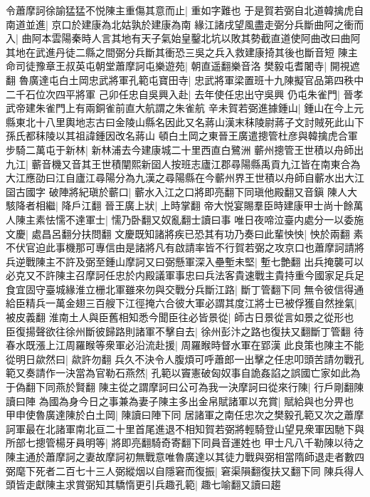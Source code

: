 令蕭摩訶徐諭猛猛不悦陳主重傷其意而止|{
	重如字難也}
于是賀若弼自北道韓擒虎自南道並進|{
	京口於建康為北姑孰於建康為南}
緣江諸戌望風盡走弼分兵斷曲阿之衝而入|{
	曲阿本雲陽秦時人言其地有天子氣始皇鑿北坑以敗其勢截直道使阿曲改曰曲阿其地在武進丹徒二縣之間弼分兵斷其衝恐三吳之兵入救建康掎其後也斷音短}
陳主命司徒豫章王叔英屯朝堂蕭摩訶屯樂遊苑|{
	朝直遥翻樂音洛}
樊毅屯耆闍寺|{
	開視遮翻}
魯廣達屯白土岡忠武將軍孔範屯寶田寺|{
	忠武將軍梁置班十九陳擬官品第四秩中二千石位次四平將軍}
己卯任忠自吳興入赴|{
	去年使任忠出守吳興}
仍屯朱雀門|{
	晉孝武帝建朱雀門上有兩銅雀前直大航謂之朱雀航}
辛未賀若弼進據鍾山|{
	鍾山在今上元縣東北十八里輿地志古曰金陵山縣名因此又名蔣山漢末秣陵尉蔣子文討賊死此山下孫氏都秣陵以其祖諱鍾因改名蔣山}
頓白土岡之東晉王廣遣摠管杜彦與韓擒虎合軍步騎二萬屯于新林|{
	新林浦去今建康城二十里西直白鷺洲}
蘄州摠管王世積以舟師出九江|{
	蘄音機又音其王世積闡熙新囶人按班志廬江郡尋陽縣禹貢九江皆在南東合為大江應劭曰江自廬江尋陽分為九漢之尋陽縣在今蘄州界王世積以舟師自蘄水出大江囶古國字}
破陣將紀瑱於蘄口|{
	蘄水入江之口將即亮翻下同瑱他殿翻又音鎭}
陳人大駭降者相繼|{
	降戶江翻}
晉王廣上狀|{
	上時掌翻}
帝大悦宴賜羣臣時建康甲士尚十餘萬人陳主素怯懦不達軍士|{
	懦乃卧翻又奴亂翻士讀曰事}
唯日夜啼泣臺内處分一以委施文慶|{
	處昌呂翻分扶問翻}
文慶既知諸將疾已恐其有功乃奏曰此輩怏怏|{
	怏於兩翻}
素不伏官迫此事機那可專信由是諸將凡有啟請率皆不行賀若弼之攻京口也蕭摩訶請將兵逆戰陳主不許及弼至鍾山摩訶又曰弼懸軍深入壘塹未堅|{
	塹七艶翻}
出兵掩襲可以必克又不許陳主召摩訶任忠於内殿議軍事忠曰兵法客貴速戰主貴持重今國家足兵足食宜固守臺城緣淮立栅北軍雖來勿與交戰分兵斷江路|{
	斷丁管翻下同}
無令彼信得通給臣精兵一萬金翅三百艘下江徑掩六合彼大軍必謂其度江將士已被俘獲自然挫氣|{
	被皮義翻}
淮南土人與臣舊相知悉今聞臣往必皆景從|{
	師古日景從言如景之從形也}
臣復揚聲欲往徐州斷彼歸路則諸軍不擊自去|{
	徐州彭汴之路也復扶又翻斷丁管翻}
待春水既漲上江周羅睺等衆軍必沿流赴援|{
	周羅睺時督水軍在郢漢}
此良策也陳主不能從明日歘然曰|{
	歘許勿翻}
兵久不決令人腹煩可呼蕭郎一出擊之任忠叩頭苦請勿戰孔範又奏請作一決當為官勒石燕然|{
	孔範以竇憲破匈奴事自詭姦諂之誤國亡家如此為于偽翻下同燕於賢翻}
陳主從之謂摩訶曰公可為我一決摩訶曰從來行陳|{
	行戶剛翻陳讀曰陣}
為國為身今日之事兼為妻子陳主多出金帛賦諸軍以充賞|{
	賦給與也分畀也}
甲申使魯廣達陳於白土岡|{
	陳讀曰陣下同}
居諸軍之南任忠次之樊毅孔範又次之蕭摩訶軍最在北諸軍南北亘二十里首尾進退不相知賀若弼將輕騎登山望見衆軍因馳下與所部七摠管楊牙員明等|{
	將即亮翻騎奇寄翻下同員音運姓也}
甲士凡八千勒陳以待之陳主通於蕭摩訶之妻故摩訶初無戰意唯魯廣達以其徒力戰與弼相當隋師退走者數四弼麾下死者二百七十三人弼縱烟以自隱窘而復振|{
	窘渠隕翻復扶又翻下同}
陳兵得人頭皆走獻陳主求賞弼知其驕惰更引兵趣孔範|{
	趣七喻翻又讀曰趨}
